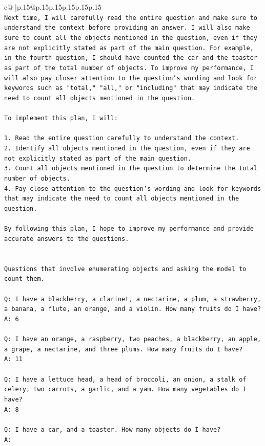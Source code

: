 \documentclass{article}
\begin{document}
{\begin{supertabular}{c@{$\;$}|p{.15\linewidth}@{}p{.15\linewidth}p{.15\linewidth}p{.15\linewidth}p{.15\linewidth}p{.15\linewidth}}
{{{\\ 
\texttt{Next time, I will carefully read the entire question and make sure to understand the context before providing an answer. I will also make sure to count all the objects mentioned in the question, even if they are not explicitly stated as part of the main question. For example, in the fourth question, I should have counted the car and the toaster as part of the total number of objects. To improve my performance, I will also pay closer attention to the question's wording and look for keywords such as "total," "all," or "including" that may indicate the need to count all objects mentioned in the question.} \\
\\ 
\texttt{To implement this plan, I will:} \\
\\ 
\texttt{1. Read the entire question carefully to understand the context.} \\
\texttt{2. Identify all objects mentioned in the question, even if they are not explicitly stated as part of the main question.} \\
\texttt{3. Count all objects mentioned in the question to determine the total number of objects.} \\
\texttt{4. Pay close attention to the question's wording and look for keywords that may indicate the need to count all objects mentioned in the question.} \\
\\ 
\texttt{By following this plan, I hope to improve my performance and provide accurate answers to the questions.} \\
\\ 
\\ 
\texttt{Questions that involve enumerating objects and asking the model to count them.} \\
\\ 
\texttt{Q: I have a blackberry, a clarinet, a nectarine, a plum, a strawberry, a banana, a flute, an orange, and a violin. How many fruits do I have?} \\
\texttt{A: 6} \\
\\ 
\texttt{Q: I have an orange, a raspberry, two peaches, a blackberry, an apple, a grape, a nectarine, and three plums. How many fruits do I have?} \\
\texttt{A: 11} \\
\\ 
\texttt{Q: I have a lettuce head, a head of broccoli, an onion, a stalk of celery, two carrots, a garlic, and a yam. How many vegetables do I have?} \\
\texttt{A: 8} \\
\\ 
\texttt{Q: I have a car, and a toaster. How many objects do I have?} \\
\texttt{A:} \\
            }
        }
    }
     \\ \\


\end{supertabular}}
\end{document}
